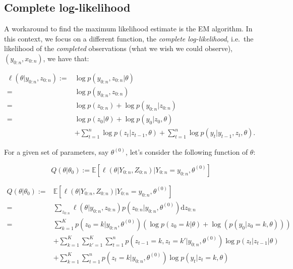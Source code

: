 \documentclass[]{book}
\begin{document}
\hypertarget{complete-log-likelihood}{%
\subsection{Complete log-likelihood}\label{complete-log-likelihood}}

A workaround to find the maximum likelihood estimate is the EM algorithm.
In this context, we focus on a different function, the \emph{complete log-likelihood}, i.e.~the likelihood of the \emph{completed} observations (what we wish we could observe), \((y_{0:n}, x_{0:n})\), we have that:

\begin{align}
\ell(\theta \vert y_{0:n}, z_{0:n}) :=& \log p(y_{0:n}, z_{0:n} \vert \theta) \nonumber \\
=& \log p(y_{0:n}, z_{0:n}) \nonumber \\
=& \log p(z_{0:n}) + \log p(y_{0:n}\vert z_{0:n}) \nonumber \\
=&  \log p(z_0 \vert \theta) + \log p(y_0\vert z_0, \theta) \nonumber \\ 
&+ \sum_{t = 1}^n \log p(z_{t} \vert z_{t - 1}, \theta) + \sum_{t = 1}^n \log p(y_{t}\vert y_{t -1}, z_{t}, \theta)  \label{eq:AR-HMM-complete-log-likelihood}.
\end{align}

For a given set of parameters, say \(\theta^{(0)}\), let's consider the following function of \(\theta\):

\begin{equation}
Q(\theta \vert \theta_0) := \mathbb{E}[\ell(\theta \vert Y_{0:n}, Z_{0:n}) \vert Y_{0:n} = y_{0:n}, \theta^{(0)}] \label{eq:E-step-function}
\end{equation}

\begin{align}
Q(\theta \vert \theta_0) :=& \mathbb{E}[\ell(\theta \vert Y_{0:n}, Z_{0:n}) \vert Y_{0:n} = y_{0:n}, \theta^{(0)}]\nonumber \\
=& \sum_{z_{0:n}} \ell(\theta \vert y_{0:n}, z_{0:n}) p(z_{0:n} \vert y_{0:n}, \theta^{(0)}) \text{d} z_{0:n} \nonumber \\
=& \sum_{k = 1}^K p(z_0 = k \vert y_{0:n}, \theta^{(0)})\left(\log p(z_0 = k \vert \theta) + \log(p(y_0 \vert z_0 = k, \theta))\right)  \nonumber \\
& + \sum_{k = 1}^K\sum_{k' = 1}^K \sum_{t = 1}^n p(z_{t-1} = k, z_{t} = k'\vert y_{0:n}, \theta^{(0)}) \log p(z_{t} \vert z_{t - 1} \vert \theta) \nonumber \\
& + \sum_{k = 1}^K \sum_{t = 1}^n p(z_t = k\vert y_{0:n}, \theta^{(0)}) \log p(y_{t} \vert z_{t} = k, \theta) \nonumber
\end{align}


\end{document}
